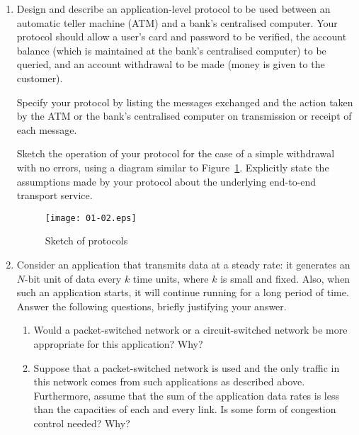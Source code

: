 \documentclass[11pt,a4paper]{article}
\begin{document}
\begin{enumerate}

  \item Design and describe an application-level protocol to be used
  between an automatic teller machine (ATM) and a bank's centralised
  computer. Your protocol should allow a user's card and password to
  be verified, the account balance (which is maintained at the bank's
  centralised computer) to be queried, and an account withdrawal to be
  made (money is given to the customer).

  Specify your protocol by listing the messages exchanged and the
  action taken by the ATM or the bank's centralised computer on
  transmission or receipt of each message.

  Sketch the operation of your protocol for the case of a simple
  withdrawal with no errors, using a diagram similar to
  Figure~\ref{protocols}. Explicitly state the assumptions made
  by your protocol about the underlying end-to-end transport service.

  \begin{figure}
  \begin{center}
  \texttt{[image: 01-02.eps]}
  \caption{Sketch of protocols}\label{protocols}
  \end{center}
  \end{figure}
 
  \item Consider an application that transmits data at a steady rate:
  it generates an \(N\)-bit unit of data every \(k\) time units, where
  \(k\) is small and fixed. Also, when such an application starts, it
  will continue running for a long period of time. Answer the
  following questions, briefly justifying your answer.

  \begin{enumerate}
 
    \item Would a packet-switched network or a circuit-switched
    network be more appropriate for this application? Why?

    \item Suppose that a packet-switched network is used and the only
    traffic in this network comes from such applications as described
    above. Furthermore, assume that the sum of the application data
    rates is less than the capacities of each and every link. Is some
    form of congestion control needed? Why?

  \end{enumerate}

\end{enumerate}
\end{document}
